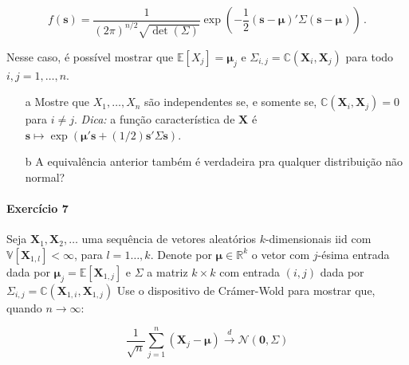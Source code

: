 \documentclass[10pt,a4paper]{article}
\begin{document}
$$f(\boldsymbol{s}) =\frac{1}{(2\pi)^{n/2} \sqrt{\operatorname{det}(\Sigma)}}\exp\left(-\frac{1}{2}(\boldsymbol{s}-\boldsymbol{\mu})'\Sigma (\boldsymbol{s}-\boldsymbol{\mu})\right)\, .$$

Nesse caso, é possível mostrar que $\mathbb{E}[X_j] =\boldsymbol{\mu}_j$ e $\Sigma_{i,j} = \mathbb{C}(\boldsymbol{X}_i,\boldsymbol{X}_j)$ para todo $i,j=1,\ldots, n$.
\begin{itemize}
	\item[a] Mostre que $X_1,\ldots,X_n$ são independentes se, e somente se, $ \mathbb{C}(\boldsymbol{X}_i,\boldsymbol{X}_j) = 0$ para $i\neq j$. \textit{Dica:} a função característica de $\boldsymbol{X}$ é  $\boldsymbol{s}\mapsto \exp(\boldsymbol{\mu}'\boldsymbol{s} + (1/2)\boldsymbol{s}'\Sigma \boldsymbol{s})$.
	\item[b] A equivalência anterior também é verdadeira pra qualquer distribuição não normal?  
\end{itemize}

\paragraph{Exercício 7} Seja $\boldsymbol{X}_1,\boldsymbol{X}_2,\ldots$ uma sequência de vetores aleatórios $k$-dimensionais iid com $\mathbb{V}[\boldsymbol{X}_{1,l}]<\infty$, para $l=1\ldots, k$. Denote por $\boldsymbol{\mu} \in \mathbb{R}^k$ o vetor com $j$-ésima entrada dada por $\boldsymbol{\mu}_j = \mathbb{E}[\boldsymbol{X}_{1,j}]$ e $\Sigma$ a matriz $k\times k$ com entrada $(i,j)$ dada por $\Sigma_{i,j} = \mathbb{C}(\boldsymbol{X}_{1,i},\boldsymbol{X}_{1,j})$ Use o dispositivo de Crámer-Wold para mostrar que, quando $n \to \infty$:

$$\frac{1}{\sqrt{n}}\sum_{j=1}^n(\boldsymbol{X}_j -\boldsymbol{\mu})\overset{d}{\to}\mathcal{N}(\boldsymbol{0},\Sigma)$$
\end{document}
